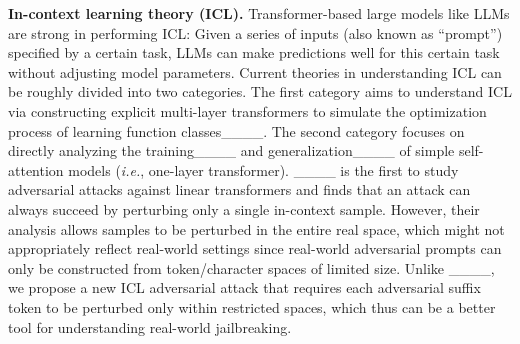 \textbf{In-context learning theory (ICL).}
Transformer-based large models like LLMs are strong in performing ICL:
Given a series of inputs (also known as ``prompt'') specified by a certain task, LLMs can make predictions well for this certain task without adjusting model parameters.
Current theories in understanding ICL can be roughly divided into two categories.
The first category aims to understand ICL via constructing explicit multi-layer transformers to simulate the optimization process of learning function classes____.
The second category focuses on directly analyzing the training____ and generalization____ of simple self-attention models ({\it i.e.}, one-layer transformer).
____ is the first to study adversarial attacks against linear transformers and finds that an attack can always succeed by perturbing only a single in-context sample.
However, their analysis allows samples to be perturbed in the entire real space, which might not appropriately reflect real-world settings since real-world adversarial prompts can only be constructed from token/character spaces of limited size.
Unlike ____, we propose a new ICL adversarial attack that requires each adversarial suffix token to be perturbed only within restricted spaces, which thus can be a better tool for understanding real-world jailbreaking.